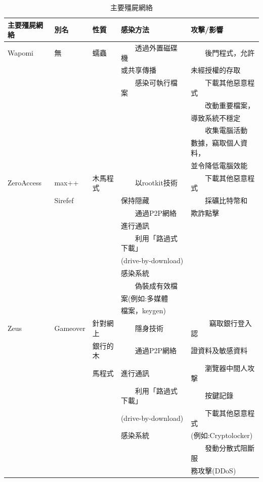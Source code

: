 \documentclass[14pt]{extarticle}
\newcommand{\tabitem}{~~\llap{\textbullet}~~}
\begin{document}
\begin{table}[!htbp]
\centering
\caption{主要殭屍網絡}
\begin{tabular}{lllll} \hline
\bf 主要殭屍網絡 & \bf 別名 & \bf 性質 & \bf 感染方法 & \bf 攻擊/影響\\\hline
Wapomi	& 無	& 蠕蟲	& \tabitem 透過外置磁碟機& \tabitem 後門程式，允許 \\
 &&& 或共享傳播 & 未經授權的存取 \\
&&& \tabitem 感染可執行檔案 & \tabitem 下載其他惡意程式 \\
&&&& \tabitem 改動重要檔案，\\
&&&& 導致系統不穩定\\
&&&&\tabitem 收集電腦活動\\
&&&& 數據，竊取個人資料，\\
&&&& 並令降低電腦效能\\\hline
ZeroAccess	& max++ & 木馬程式 & \tabitem 以rootkit技術  & \tabitem 下載其他惡意程式 \\
& 	Sirefef & &	保持隠藏 & \tabitem 採礦比特幣和 \\
&&& \tabitem 通過P2P網絡 & 欺詐點擊\\
&&& 進行通訊\\
&&& \tabitem 利用「路過式下載」\\
&&& (drive-by-download)\\
&&& 感染系統\\
&&& \tabitem 偽裝成有效檔\\
&&& 案(例如:多媒體\\
&&& 檔案，keygen)	\\\hline
Zeus	& Gameover & 針對網上 & \tabitem 隱身技術  & \tabitem 	竊取銀行登入認 \\
& 	 & 銀行的木 &	\tabitem 通過P2P網絡& 證資料及敏感資料 \\
&&馬程式& 進行通訊 & \tabitem 瀏覽器中間人攻撃 \\
&&& \tabitem 利用「路過式下載」 & \tabitem 按鍵記錄\\
&&& (drive-by-download) & \tabitem 下載其他惡意程式\\
&&& 感染系統 & (例如:Cryptolocker)\\
&&&& \tabitem 發動分散式阻斷服 \\
&&&& 務攻擊(DDoS) \\\hline

\end{tabular}
\end{table}
\newpage
\end{document}
